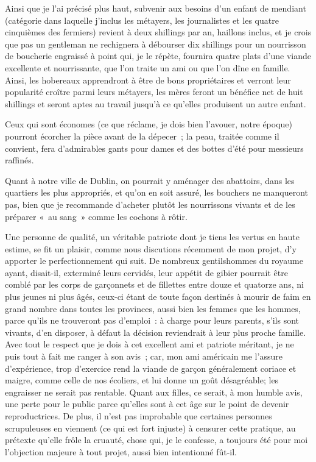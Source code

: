 \documentclass[french,twoside]{book} %
\begin{document}
Ainsi que je l’ai précisé plus haut, subvenir aux besoins d’un enfant de mendiant (catégorie dans laquelle j’inclus les métayers, les journalistes et les quatre cinquièmes des fermiers) revient à deux shillings par an, haillons inclus, et je crois que pas un gentleman ne rechignera à débourser dix shillings pour un nourrisson de boucherie engraissé à point qui, je le répète, fournira quatre plats d’une viande excellente et nourrissante, que l’on traite un ami ou que l’on dîne en famille. Ainsi, les hobereaux apprendront à être de bons propriétaires et verront leur popularité croître parmi leurs métayers, les mères feront un bénéfice net de huit shillings et seront aptes au travail jusqu’à ce qu’elles produisent un autre enfant.\par
Ceux qui sont économes (ce que réclame, je dois bien l’avouer, notre époque) pourront écorcher la pièce avant de la dépecer ; la peau, traitée comme il convient, fera d’admirables gants pour dames et des bottes d’été pour messieurs raffinés.\par
Quant à notre ville de Dublin, on pourrait y aménager des abattoirs, dans les quartiers les plus appropriés, et qu’on en soit assuré, les bouchers ne manqueront pas, bien que je recommande d’acheter plutôt les nourrissons vivants et de les préparer « au sang » comme les cochons à rôtir.\par
Une personne de qualité, un véritable patriote dont je tiens les vertus en haute estime, se fit un plaisir, comme nous discutions récemment de mon projet, d’y apporter le perfectionnement qui suit. De nombreux gentilshommes du royaume ayant, disait-il, exterminé leurs cervidés, leur appétit de gibier pourrait être comblé par les corps de garçonnets et de fillettes entre douze et quatorze ans, ni plus jeunes ni plus âgés, ceux-ci étant de toute façon destinés à mourir de faim en grand nombre dans toutes les provinces, aussi bien les femmes que les hommes, parce qu’ils ne trouveront pas d’emploi : à charge pour leurs parents, s’ils sont vivants, d’en disposer, à défaut la décision reviendrait à leur plus proche famille. Avec tout le respect que je dois à cet excellent ami et patriote méritant, je ne puis tout à fait me ranger à son avis ; car, mon ami américain me l’assure d’expérience, trop d’exercice rend la viande de garçon généralement coriace et maigre, comme celle de nos écoliers, et lui donne un goût désagréable; les engraisser ne serait pas rentable. Quant aux filles, ce serait, à mon humble avis, une perte pour le public parce qu’elles sont à cet âge sur le point de devenir reproductrices. De plus, il n’est pas improbable que certaines personnes scrupuleuses en viennent (ce qui est fort injuste) à censurer cette pratique, au prétexte qu’elle frôle la cruauté, chose qui, je le confesse, a toujours été pour moi l’objection majeure à tout projet, aussi bien intentionné fût-il.\par
\end{document}
